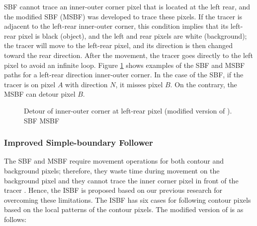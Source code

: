 SBF cannot trace an inner-outer corner pixel that is located at the left rear, and the modified SBF (MSBF) \JHMEMO{[3]} was developed to trace these pixels. If the tracer is adjacent to the left-rear inner-outer corner, this condition implies that its left-rear pixel is black (object), and the left and rear pixels are white (background); the tracer will move to the left-rear pixel, and its direction is then changed toward the rear direction. After the movement, the tracer goes directly to the left pixel to avoid an infinite loop. Figure \ref{fig:image3} shows examples of the SBF and MSBF paths for a left-rear direction inner-outer corner. In the case of the SBF, if the tracer is on pixel $A$ with direction $N$, it misses pixel $B$. On the contrary, the MSBF can detour pixel $B$.

\begin{figure}[htbp]
	\centering
	 
	\caption{Detour of inner-outer corner at left-rear pixel (modified version of \cite{Gose1996Pattern}). \protect{} SBF \protect{} MSBF}
	\label{fig:image3}
\end{figure}

\subsubsection{Improved Simple-boundary Follower}

The SBF and MSBF require movement operations for both contour and background pixels; therefore, they waste time during movement on the background pixel and they cannot trace the inner corner pixel in front of the tracer \cite{Cheong2006Improved,Toussaint????Grids}. Hence, the ISBF \cite{Cheong2006Improved} is proposed based on our previous research for overcoming these limitations. The ISBF has six cases for following contour pixels based on the local patterns of the contour pixels. The modified version of \cite{Cheong2006Advanced} is as follows: 

